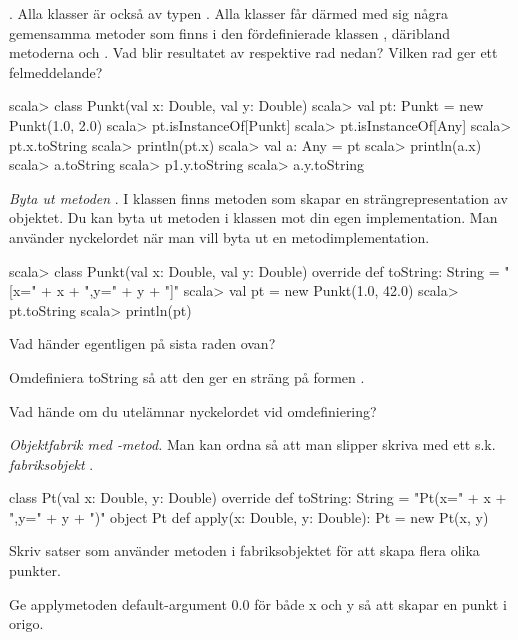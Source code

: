 \Task \emph{}. Alla klasser är också av typen . Alla klasser får därmed med sig några gemensamma metoder som finns i den fördefinierade klassen , däribland metoderna   och .  Vad blir resultatet av respektive rad nedan? Vilken rad ger ett felmeddelande?

\begin{REPL}
scala> class Punkt(val x: Double, val y: Double)
scala> val pt: Punkt = new Punkt(1.0, 2.0)
scala> pt.isInstanceOf[Punkt]
scala> pt.isInstanceOf[Any]
scala> pt.x.toString
scala> println(pt.x)
scala> val a: Any = pt
scala> println(a.x)
scala> a.toString
scala> p1.y.toString
scala> a.y.toString
\end{REPL}

\Task \emph{Byta ut metoden }. I klassen  finns metoden  som skapar en strängrepresentation av objektet. Du kan byta ut metoden  i klassen  mot din egen implementation. Man använder nyckelordet  när man vill byta ut en metodimplementation.

\begin{REPL}
scala> class Punkt(val x: Double, val y: Double) {
         override def toString: String = "[x=" + x + ",y=" + y + "]"
       }
scala> val pt = new Punkt(1.0, 42.0)
scala> pt.toString
scala> println(pt)
\end{REPL}

\Subtask Vad händer egentligen på sista raden ovan?

\Subtask Omdefiniera toString så att den ger en sträng på formen .

\Subtask Vad hände om du utelämnar nyckelordet  vid omdefiniering?

\Task \emph{Objektfabrik med -metod.} Man kan ordna så att man slipper skriva  med ett s.k. \emph{fabriksobjekt} . 
\begin{Code}
class Pt(val x: Double, y: Double) {
  override def toString: String = "Pt(x=" + x + ",y=" + y + ")"
}
object Pt { 
  def apply(x: Double, y: Double): Pt = new Pt(x, y)
}
\end{Code}

\Subtask Skriv satser som använder metoden  i fabriksobjektet  för att skapa flera olika punkter.

\Subtask Ge applymetoden default-argument 0.0 för både x och y så att  skapar en punkt i origo.

